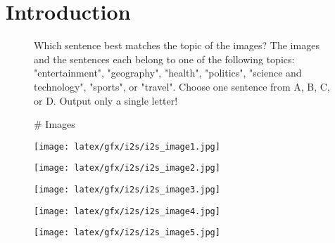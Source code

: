 \section{Introduction}
\label{sec:intro}

\begin{figure}[ht]
\begin{adjustbox}{width=\columnwidth,center}
\begin{tcolorbox}[
    colback=white!95!black,    %
    colframe=black,            %
    title=Images-To-Sentences (\its), %
    fonttitle=\bfseries\Large,       %
    boxrule=0.5pt,             %
    arc=4pt,                   %
    outer arc=4pt,
    width=\textwidth,          %
    boxsep=1pt,
    left=7pt,
    right=7pt,
    enlarge left by=0mm,
    enlarge right by=0mm,
    before skip=0.5em,           %
    after skip=0.5em,            %
]

Which sentence best matches the topic of the images? The images and the sentences each belong
to one of the following topics: "entertainment", "geography", "health", "politics", "science and technology", "sports", or "travel". Choose one sentence from A, B, C, or D. Output only 
a single letter!

\medskip

\# Images

\begin{center}
    \begin{minipage}{0.18\textwidth}
        \centering
        \texttt{[image: latex/gfx/i2s/i2s\_image1.jpg]}
    \end{minipage}
    \hfill
    \begin{minipage}{0.18\textwidth}
        \centering
        \texttt{[image: latex/gfx/i2s/i2s\_image2.jpg]}
    \end{minipage}
    \hfill
    \begin{minipage}{0.18\textwidth}
        \centering
        \texttt{[image: latex/gfx/i2s/i2s\_image3.jpg]}
    \end{minipage}
    \hfill
    \begin{minipage}{0.18\textwidth}
        \centering
        \texttt{[image: latex/gfx/i2s/i2s\_image4.jpg]}
    \end{minipage}
    \hfill
    \begin{minipage}{0.18\textwidth}
        \centering
        \texttt{[image: latex/gfx/i2s/i2s\_image5.jpg]}
    \end{minipage}
\end{center}


\end{tcolorbox}
\end{adjustbox}
\end{figure}
